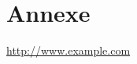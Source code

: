 \documentclass[a4paper]{article}
\begin{document}










\appendix










\section{Annexe}













\newpage \tableofcontents \listoffigures \listoflistings
\begin{thebibliography}{9}
 {\small \url{http://www.example.com}}
\end{thebibliography}
\end{document}
